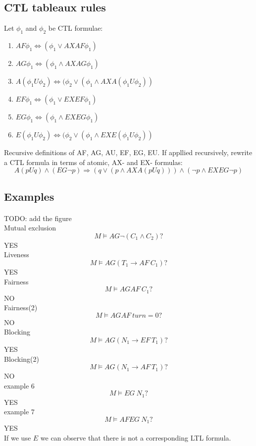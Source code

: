 \documentclass[11pt]{article}
\begin{document}
\subsection{CTL tableaux rules} %
\label{sub:ctl_tableaux_rules}
Let $\phi_1$ and $\phi_2$ be CTL formulae:
\begin{enumerate}
	\item $AF\phi_1 \Leftrightarrow (\phi_1 \lor AXAF \phi_1)$
	\item $AG\phi_1 \Leftrightarrow (\phi_1 \land AXAG \phi_1)$ 
	\item $A(\phi_1 U \phi_2) \Leftrightarrow (\phi_2 \lor (\phi_1 \land AXA (\phi_1 U \phi_2))$
	\item $EF\phi_1 \Leftrightarrow (\phi_1 \lor EXEF \phi_1)$
	\item $EG\phi_1 \Leftrightarrow (\phi_1 \land EXEG \phi_1)$ 
	\item $E(\phi_1 U \phi_2) \Leftrightarrow (\phi_2 \lor (\phi_1 \land EXE (\phi_1 U \phi_2))$
\end{enumerate}
Recursive definitions of AF, AG, AU, EF, EG, EU.
If appllied recursively, rewrite a CTL formula in terms of atomic, AX- and EX- formulas:
\[
	A(pUq) \land (EG\lnot p) \Rightarrow (q \lor (p \land AXA(pUq))) \land (\lnot p \land EXEG \lnot p)
\]

\subsection{Examples} %
\label{sub:examples}
\paragraph{} %
\label{par:}
TODO: add the figure \\
Mutual exclusion
\[
	M \models AG \lnot (C_1 \land C_2) ?
\] YES\\

Liveness
\[
	M \models AG (T_1 \rightarrow AF\ C_1) ?
\]
YES \\

Fairness
\[
	M \models AGAF\ C_1 ?
\]
NO \\

Fairness(2)
\[
	M \models AGAF\ turn=0 ?
\]
NO \\

Blocking
\[
	M \models AG (N_1 \rightarrow EF\ T_1) ?
\]
YES \\

Blocking(2)
\[
	M \models AG (N_1 \rightarrow AF\ T_1) ?
\]
NO \\

example 6
\[
	M \models EG\ N_1?
\]
YES \\

example 7
\[
	M \models AFEG\ N_1?
\]
YES \\

If we use $E$ we can observe that there is not a corresponding LTL formula.
\end{document}
